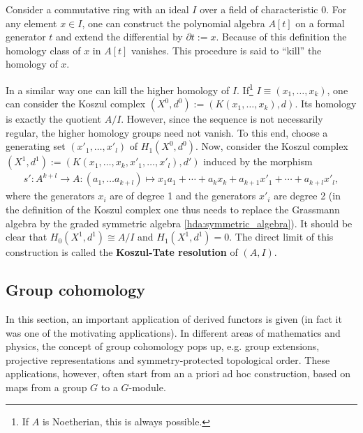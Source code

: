     \begin{property}\label{homalg:koszul_tate_resolution}
        Consider a commutative ring with an ideal $I$ over a field of characteristic 0. For any element $x\in I$, one can construct the polynomial algebra $A[t]$ on a formal generator $t$ and extend the differential by $\partial t:=x$. Because of this definition the homology class of $x$ in $A[t]$ vanishes. This procedure is said to ``kill'' the homology of $x$.

        In a similar way one can kill the higher homology of $I$. If\footnote{If $A$ is Noetherian, this is always possible.} $I\equiv(x_1,\ldots,x_k)$, one can consider the Koszul complex $(X^0,d^0):=(K(x_1,\ldots,x_k),d)$. Its homology is exactly the quotient $A/I$. However, since the sequence is not necessarily regular, the higher homology groups need not vanish. To this end, choose a generating set $(x'_1,\ldots,x'_l)$ of $H_1(X^0,d^0)$. Now, consider the Koszul complex $(X^1,d^1):=(K(x_1,\ldots,x_k,x'_1,\ldots,x'_l),d')$ induced by the morphism
        \begin{gather}
            s':A^{k+l}\rightarrow A:(a_1,\ldots a_{k+l})\mapsto x_1a_1+\cdots+a_kx_k+a_{k+1}x'_1+\cdots+a_{k+l}x'_l,
        \end{gather}
        where the generators $x_i$ are of degree 1 and the generators $x'_i$ are degree 2 (in the definition of the Koszul complex one thus needs to replace the Grassmann algebra by the graded symmetric algebra \ref{hda:symmetric_algebra}). It should be clear that $H_0(X^1,d^1)\cong A/I$ and $H_1(X^1,d^1)=0$. The direct limit of this construction is called the \textbf{Koszul-Tate resolution} of $(A,I)$.
    \end{property}

\subsection{Group cohomology}\label{section:group_cohomology}

	In this section, an important application of derived functors is given (in fact it was one of the motivating applications). In different areas of mathematics and physics, the concept of group cohomology pops up, e.g. group extensions, projective representations and symmetry-protected topological order. These applications, however, often start from an a priori ad hoc construction, based on maps from a group $G$ to a $G$-module.

